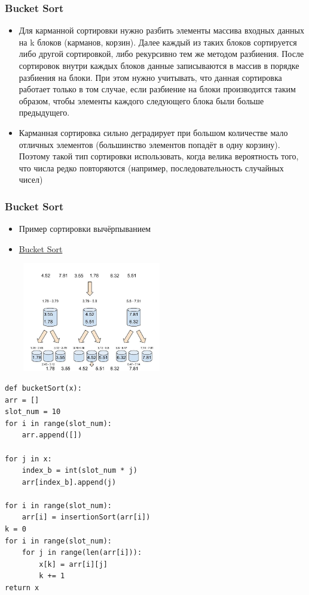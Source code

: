 \documentclass[t]{beamer}  %
\begin{document}

\begin{frame}[t]
	\frametitle{Bucket Sort}
	\begin{itemize}
		\pause
		\item Для карманной сортировки нужно разбить элементы массива входных данных на k блоков (карманов, корзин). Далее каждый из таких блоков сортируется либо другой сортировкой, либо рекурсивно тем же методом разбиения. После сортировок внутри каждых блоков данные записываются в массив в порядке разбиения на блоки. При этом нужно учитывать, что данная сортировка работает только в том случае, если разбиение на блоки производится таким образом, чтобы элементы каждого следующего блока были больше предыдущего.\pause
		\item 	Карманная сортировка сильно деградирует при большом количестве мало отличных элементов (большинство элементов попадёт в одну корзину). Поэтому такой тип сортировки использовать, когда велика вероятность того, что числа редко повторяются (например, последовательность случайных чисел) \pause
	\end{itemize}
\end{frame}


\begin{frame}[t]
	\frametitle{Bucket Sort}
		\begin{itemize}
		\item Пример сортировки вычёрпыванием
		\item \href{https://www.cs.usfca.edu/~galles/visualization/BucketSort.html}{Bucket Sort}
	\end{itemize}
		\includegraphics[width=290px,height=180px]{sort3.jpg}
	

\end{frame}



\begin{lstlisting}[label=some-code,caption={Реализация на Python}]
def bucketSort(x): 
arr = [] 
slot_num = 10 
for i in range(slot_num): 
    arr.append([]) 

for j in x: 
    index_b = int(slot_num * j)  
    arr[index_b].append(j) 

for i in range(slot_num): 
    arr[i] = insertionSort(arr[i]) 
k = 0
for i in range(slot_num): 
    for j in range(len(arr[i])): 
        x[k] = arr[i][j] 
        k += 1
return x 
\end{lstlisting}
\end{document}

